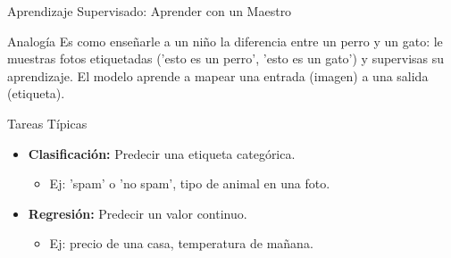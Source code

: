 \documentclass[aspectratio=169,xcolor=dvipsnames]{beamer}
\begin{document}
\begin{frame}{Aprendizaje Supervisado: Aprender con un Maestro}
    \begin{block}{Analogía}
    Es como enseñarle a un niño la diferencia entre un perro y un gato: le muestras fotos etiquetadas ('esto es un perro', 'esto es un gato') y supervisas su aprendizaje. El modelo aprende a mapear una entrada (imagen) a una salida (etiqueta).
    \end{block}
    
    \begin{alertblock}{Tareas Típicas}
        \begin{itemize}
            \item \textbf{Clasificación:} Predecir una etiqueta categórica.
                \begin{itemize}
                    \item Ej: 'spam' o 'no spam', tipo de animal en una foto.
                \end{itemize}
            \item \textbf{Regresión:} Predecir un valor continuo.
                \begin{itemize}
                    \item Ej: precio de una casa, temperatura de mañana.
                \end{itemize}
        \end{itemize}
    \end{alertblock}
\end{frame}

\end{document}
